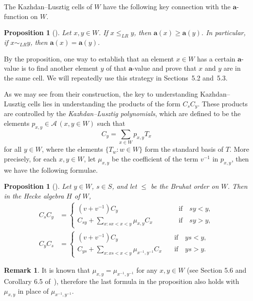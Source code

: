 \documentclass[10pt]{article}
\newtheorem{prop}[theorem]{Proposition}
\theoremstyle{definition}
\newtheorem{rema}[theorem]{Remark}
\newcommand{\cala}{\mathcal{A}}
\newcommand{\la}{\mathbf{a}}
\newcommand{\inverse}{^{-1}}
\begin{document}
The Kazhdan--Lusztig cells of $W$ have the following key connection with the
$\la$-function on $W$.

\begin{prop}[{\cite[Section 14]{LG}}]
 \label{constant}
 Let $x,y\in W$. If $x\le_{LR} y$, then $\la(x)\ge \la(y)$. In particular, if
 $x\sim_{LR} y$, then $\la(x)=\la(y)$.
\end{prop}

By the proposition, one way to establish that an element $x\in W$ has a certain
$\la$-value is to find another element $y$ of that $\la$-value and prove that
$x$ and $y$ are in the same cell. We will repeatedly use this strategy in
Sections~5.2 and~5.3.

As we may see from their construction, the key to understanding Kazhdan--Lusztig cells lies in
understanding the products of the form $C_sC_y$. These products are controlled
by the \emph{Kazhdan--Lusztig polynomials}, which are defined to be the elements $p_{x,y}\in \cala\, (x,y\in W)$
such that 
\[
 C_y=\sum_{x\in W} p_{x,y}T_x
\]
for all $y\in W$, where the elements $\{T_w:w\in W\}$ form the standard basis
of $T$. More precisely, for each $x,y\in W$, let $\mu_{x,y}$ be the coefficient of the term
$v^{-1}$ in $p_{x,y}$, then we have the following formulae.
\begin{prop}[{\cite[Theorem 6.6]{LG}}]
 \label{KL basis mult}
 Let $y\in W$, $s\in S$, and let $\le$ be the Bruhat order on $W$. Then in the
 Hecke algebra $H$ of $W$,
 \begin{align*}
 C_s C_y&= 
 \begin{cases}
 (v+v\inverse) C_y&\quad\qquad\text{if}\quad sy<y,\\
 C_{sy}+\sum\limits_{x:sx<x<y} \mu_{x,y}C_x&\quad\qquad \text{if} \quad
 sy>y,
 \end{cases}\\
 C_y C_s&= 
 \begin{cases}
 (v+v\inverse) C_y&\quad \text{if}\quad ys<y,\\
 C_{ys}+\sum\limits_{x:xs<x<y} \mu_{x^{-1},y^{-1}}C_x&\quad \text{if}
 \quad ys>y.
 \end{cases}
 \end{align*}
\end{prop}

\begin{rema}
 \label{symmetry}
 It is known that $\mu_{x,y}=\mu_{x\inverse,y\inverse}$ for any $x,y\in W$
 (see Section 5.6 and Corollary 6.5 of~\cite{LG}),
 therefore the last formula in the proposition also holds with $\mu_{x,y}$ in
 place of $\mu_{x\inverse,y\inverse}$.
\end{rema}
\end{document}
